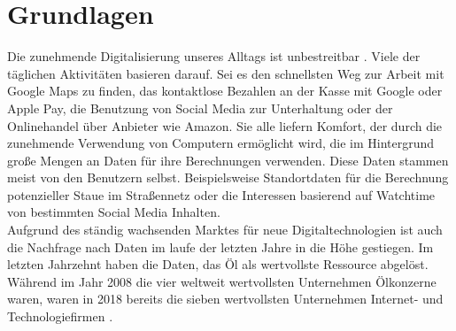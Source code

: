 \documentclass[
	fontsize=11pt,
	headings=small,
	parskip=half,           %
	bibliography=totoc,
	numbers=noenddot,       %
	open=any,               %
]{scrreprt}
\begin{document}
\chapter{Grundlagen}
\label{chap:basics}
Die zunehmende Digitalisierung unseres Alltags ist unbestreitbar \cite{dt-digitalisierung-stat}. Viele der täglichen Aktivitäten basieren darauf. Sei es den schnellsten Weg zur Arbeit mit Google Maps zu finden, das kontaktlose Bezahlen an der Kasse mit Google oder Apple Pay, die Benutzung von Social Media zur Unterhaltung oder der Onlinehandel über Anbieter wie Amazon. Sie alle liefern Komfort, der durch die zunehmende Verwendung von Computern ermöglicht wird, die im Hintergrund große Mengen an Daten für ihre Berechnungen verwenden. Diese Daten stammen meist von den Benutzern selbst. Beispielsweise Standortdaten für die Berechnung potenzieller Staue im Straßennetz \cite{dt-googlemaps-staus} oder die Interessen basierend auf Watchtime von bestimmten Social Media Inhalten. \\
Aufgrund des ständig wachsenden Marktes für neue Digitaltechnologien ist auch die Nachfrage nach Daten im laufe der letzten Jahre in die Höhe gestiegen. Im letzten Jahrzehnt haben die Daten, das Öl als wertvollste Ressource abgelöst. Während im Jahr 2008 die vier weltweit wertvollsten Unternehmen Ölkonzerne waren, waren in 2018 bereits die sieben wertvollsten Unternehmen Internet- und Technologiefirmen \cite{dt-falck2020rohstoff}. 
\end{document}

